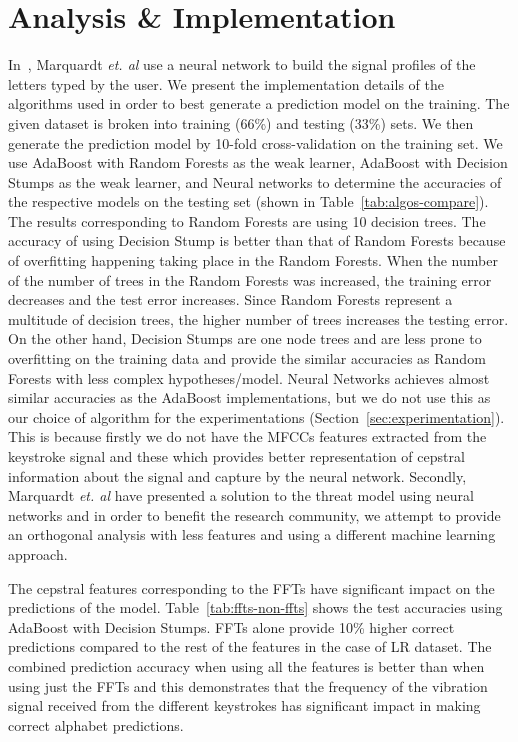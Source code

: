 \documentclass[11pt,conference]{IEEEtran}
\begin{document}
\section{Analysis \& Implementation}
\label{sec:implementation}
\noindent In~\cite{spiphone}, Marquardt \emph{et. al} use a neural network to build the signal profiles of the letters typed by the user. We present the implementation details of the algorithms used in order to best generate a prediction model on the training. The given dataset is broken into training (66\%) and testing (33\%) sets. We then generate the prediction model by 10-fold cross-validation on the training set. We use AdaBoost with Random Forests as the weak learner, AdaBoost with Decision Stumps as the weak learner, and Neural networks to determine the accuracies of the respective models on the testing set (shown in Table~\ref{tab:algos-compare}). The results corresponding to Random Forests are using 10 decision trees. The accuracy of using Decision Stump is better than that of Random Forests because of overfitting happening taking place in the Random Forests. When the number of the number of trees in the Random Forests was increased, the training error decreases and the test error increases. Since Random Forests represent a multitude of decision trees, the higher number of trees increases the testing error. On the other hand, Decision Stumps are one node trees and are less prone to overfitting on the training data and provide the similar accuracies as Random Forests with less complex hypotheses/model. Neural Networks achieves almost similar accuracies as the AdaBoost implementations, but we do not use this as our choice of algorithm for the experimentations (Section~\ref{sec:experimentation}). This is because firstly we do not have the MFCCs features extracted from the keystroke signal and these which provides better representation of cepstral information about the signal and capture by the neural network. Secondly, Marquardt \emph{et. al} have presented a solution to the threat model using neural networks and in order to benefit the research community, we attempt to provide an orthogonal analysis with less features and using a different machine learning approach.

The cepstral features corresponding to the FFTs have significant impact on the predictions of the model. Table~\ref{tab:ffts-non-ffts} shows the test accuracies using AdaBoost with Decision Stumps. FFTs alone provide 10\% higher correct predictions compared to the rest of the features in the case of LR dataset. The combined prediction accuracy when using all the features is better than when using just the FFTs and this demonstrates that the frequency of the vibration signal received from the different keystrokes has significant impact in making correct alphabet predictions.
\end{document}
